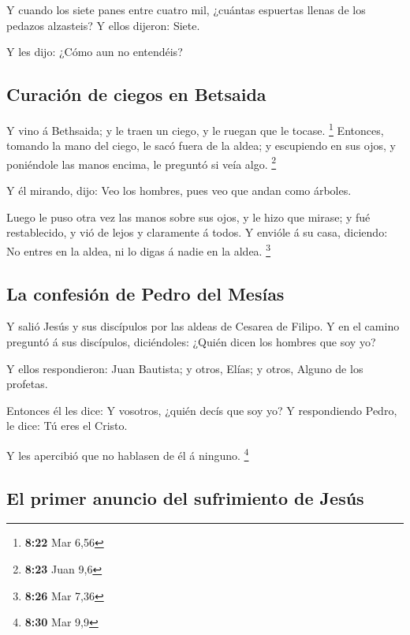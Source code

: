  Y cuando los siete panes entre cuatro mil, ¿cuántas
espuertas llenas de los pedazos alzasteis? Y ellos dijeron: Siete.

 Y les dijo: ¿Cómo aun no entendéis?

\hypertarget{curaciuxf3n-de-ciegos-en-betsaida}{%
\subsection{Curación de ciegos en
Betsaida}\label{curaciuxf3n-de-ciegos-en-betsaida}}

 Y vino á Bethsaida; y le traen un ciego, y le ruegan que
le tocase. \footnote{\textbf{8:22} Mar 6,56}  Entonces,
tomando la mano del ciego, le sacó fuera de la aldea; y escupiendo en
sus ojos, y poniéndole las manos encima, le preguntó si veía algo.
\footnote{\textbf{8:23} Juan 9,6}

 Y él mirando, dijo: Veo los hombres, pues veo que andan
como árboles.

 Luego le puso otra vez las manos sobre sus ojos, y le
hizo que mirase; y fué restablecido, y vió de lejos y claramente á
todos.  Y envióle á su casa, diciendo: No entres en la
aldea, ni lo digas á nadie en la aldea. \footnote{\textbf{8:26} Mar 7,36}

\hypertarget{la-confesiuxf3n-de-pedro-del-mesuxedas}{%
\subsection{La confesión de Pedro del
Mesías}\label{la-confesiuxf3n-de-pedro-del-mesuxedas}}

 Y salió Jesús y sus discípulos por las aldeas de Cesarea
de Filipo. Y en el camino preguntó á sus discípulos, diciéndoles: ¿Quién
dicen los hombres que soy yo?

 Y ellos respondieron: Juan Bautista; y otros, Elías; y
otros, Alguno de los profetas.

 Entonces él les dice: Y vosotros, ¿quién decís que soy
yo? Y respondiendo Pedro, le dice: Tú eres el Cristo.

 Y les apercibió que no hablasen de él á ninguno.
\footnote{\textbf{8:30} Mar 9,9}

\hypertarget{el-primer-anuncio-del-sufrimiento-de-jesuxfas}{%
\subsection{El primer anuncio del sufrimiento de
Jesús}\label{el-primer-anuncio-del-sufrimiento-de-jesuxfas}}

